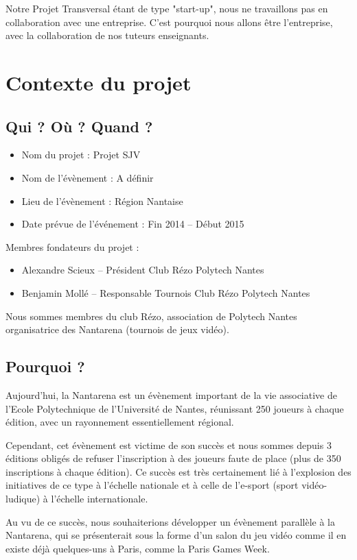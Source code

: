 \documentclass[french]{article}
\begin{document}
Notre Projet Transversal étant de type "start-up", nous ne travaillons pas en collaboration avec une entreprise. C'est pourquoi nous allons être l'entreprise, avec la collaboration de nos tuteurs enseignants.

\section{Contexte du projet}

\subsection{Qui ? Où ? Quand ?}
\begin{itemize}
	\item Nom du projet : Projet SJV
	\item Nom de l'évènement : A définir
	\item Lieu de l'évènement : Région Nantaise
	\item Date prévue de l'événement : Fin 2014 – Début 2015
\end{itemize}

Membres fondateurs du projet :
\begin{itemize}
	\item Alexandre Scieux – Président Club Rézo Polytech Nantes
	\item Benjamin Mollé – Responsable Tournois Club Rézo Polytech Nantes
\end{itemize}

Nous sommes membres du club Rézo, association de Polytech Nantes organisatrice des Nantarena (tournois de jeux vidéo).

\subsection{Pourquoi ?}

Aujourd'hui, la Nantarena est un évènement important de la vie associative de l'Ecole Polytechnique de l'Université de Nantes, réunissant 250 joueurs à chaque édition, avec un rayonnement essentiellement régional.

Cependant, cet évènement est victime de son succès et nous sommes depuis 3 éditions obligés de refuser l'inscription à des joueurs faute de place (plus de 350 inscriptions à chaque édition).
Ce succès est très certainement lié à l'explosion des initiatives de ce type à l'échelle nationale et à celle de l'e-sport (sport vidéo-ludique) à l'échelle internationale.

Au vu de ce succès, nous souhaiterions développer un évènement parallèle à la Nantarena, qui se présenterait sous la forme d'un salon du jeu vidéo comme il en existe déjà quelques-uns à Paris, comme la Paris Games Week.
\end{document}
